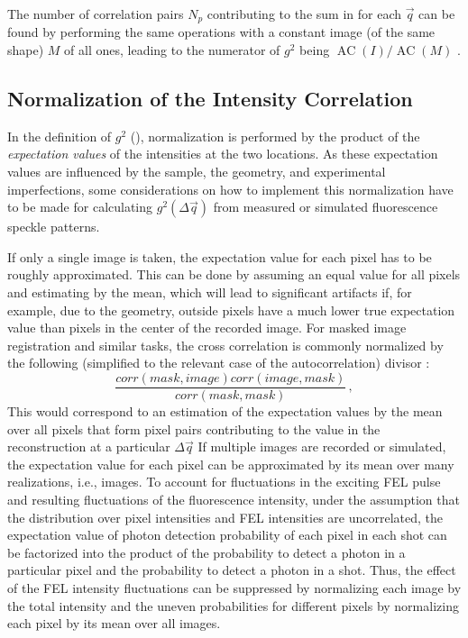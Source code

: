 The number of correlation pairs $N_p$ contributing to the sum in  for each $\vec{q}$ can be found by performing the same operations with a constant image (of the same shape) $M$ of all ones, leading to the numerator of $g^2$ being $\operatorname{AC}(I)/\operatorname{AC}(M)$ \cite{oppenheim2009,butz2015,nion2008}.

\subsection{Normalization of the Intensity Correlation}
\label{sec:normal}
In the definition of $g^2$ (), normalization is performed by the product of the \textit{expectation values} of the intensities at the two locations. As these expectation values are influenced by the sample, the geometry, and experimental imperfections, some considerations on how to implement this normalization have to be made for calculating $g^2(\Delta\vec{q})$ from measured or simulated fluorescence speckle patterns. 

If only a single image is taken, the expectation value for each pixel has to be roughly approximated. This can be done by assuming an equal value for all pixels and estimating by the mean, which will lead to significant artifacts if, for example, due to the geometry, outside pixels have a much lower true expectation value than pixels in the center of the recorded image.  
For masked image registration and similar tasks, the cross correlation is commonly normalized by the following (simplified to the relevant case of the autocorrelation) divisor \cite{padfield2010}:
\begin{equation}
	\frac{\mathit{corr}(\mathit{mask},\mathit{image}) \mathit{corr}(\mathit{image},\mathit{mask})}{\mathit{corr}(\mathit{mask},\mathit{mask})} \,,
	\label{eq:normshot}
\end{equation} This would correspond to an estimation of the expectation values by the mean over all pixels that form pixel pairs contributing to the value in the reconstruction at a particular $\Delta \vec{q}$
If multiple images are recorded or simulated, the expectation value for each pixel can be approximated by its mean over many realizations, i.e., images. To account for fluctuations in the exciting FEL pulse and resulting fluctuations of the fluorescence intensity, under the assumption that the distribution over pixel intensities and FEL intensities are uncorrelated, the expectation value of photon detection probability of each pixel in each shot can be factorized into the product of the probability to detect a photon in a particular pixel and the probability to detect a photon in a shot. Thus, the effect of the FEL intensity fluctuations can be suppressed by normalizing each image by the total intensity and the uneven probabilities for different pixels by normalizing each pixel by its mean over all images. 


